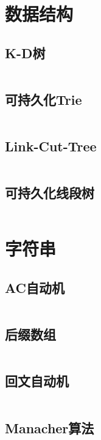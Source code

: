 \documentclass[a4paper]{article}
\newcommand{\cppcode}[1]{
    \inputminted[mathescape,
    			tabsize=2
    			]{cpp}{source/#1}
}
\begin{document}
\section{数据结构}
	\subsection{K-D树}
		\cppcode{data_structure/KDTree.cpp}

	\subsection{可持久化Trie}
		\cppcode{data_structure/persistant-trie.cpp}

	\subsection{Link-Cut-Tree}
		\cppcode{data_structure/LCT.cpp}

	\subsection{可持久化线段树}
		\cppcode{data_structure/persistant-segtree.cpp}

\section{字符串}
	\subsection{AC自动机}
		\cppcode{strings/ACautomaton.cpp}

	\subsection{后缀数组}
		\cppcode{strings/suffixarray.cpp}

	\subsection{回文自动机}
		\cppcode{strings/PAM.cpp}

	\subsection{Manacher算法}
		\cppcode{strings/manacher.cpp}
\end{document}

